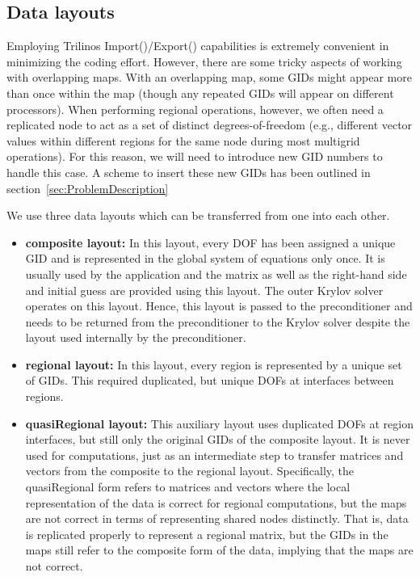 \documentclass[11pt]{article}
\begin{document}
\subsection{Data layouts}
\label{sec:DataLayouts}

Employing Trilinos {\sf Import()}/{\sf Export()} capabilities is extremely convenient
in minimizing the coding effort. However, there are some tricky aspects
of working with overlapping maps. With an overlapping map, some GIDs
might appear more than once within the map (though any repeated GIDs
will appear on different processors). When performing regional
operations, however, we often need a replicated node to act as
a set of distinct degrees-of-freedom (e.g., different vector values within
different regions for the same node during most multigrid operations).
For this reason, we will need to introduce new GID numbers to handle
this case. A scheme to insert these new GIDs has been outlined in section~\ref{sec:ProblemDescription}

We use three data layouts which can be transferred from one into each other.
\begin{itemize}
\item {\bf composite layout:} In this layout, every DOF has been assigned a unique GID and is represented in the global system of equations only once.
It is usually used by the application and the matrix as well as the right-hand side and initial guess are provided using this layout.
The outer Krylov solver operates on this layout. Hence, this layout is passed to the preconditioner and needs to be returned from the preconditioner
to the Krylov solver despite the layout used internally by the preconditioner.
\item {\bf regional layout:} In this layout, every region is represented by a unique set of GIDs. 
This required duplicated, but unique DOFs at interfaces between regions.
\item {\bf quasiRegional layout:} This auxiliary layout uses duplicated DOFs at region interfaces, 
but still only the original GIDs of the composite layout.
It is never used for computations, just as an intermediate step to transfer matrices and vectors from the composite to the regional layout.
Specifically, the quasiRegional form refers to matrices and vectors 
where the local representation of the data is correct for
regional computations, but the maps are not correct in terms of
representing shared nodes distinctly. That is, data is replicated properly
to represent a regional matrix, but the GIDs in the maps still refer to the composite form of the data, 
implying that the maps are not correct.
\end{itemize}
\end{document}
